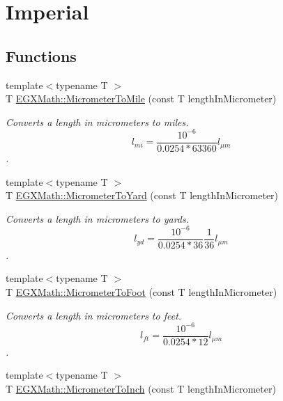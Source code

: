 \hypertarget{group___e_g_x_math-_conversions-_length_conversions-_micrometer-_imperial}{}\section{Imperial}
\label{group___e_g_x_math-_conversions-_length_conversions-_micrometer-_imperial}
\subsection*{Functions}
\begin{DoxyCompactItemize}
\item 
{\footnotesize template$<$typename T $>$ }\\T \mbox{\hyperlink{group___e_g_x_math-_conversions-_length_conversions-_micrometer-_imperial_ga0419c861d5edc78538ff023c12b9b6d9}{E\+G\+X\+Math\+::\+Micrometer\+To\+Mile}} (const T length\+In\+Micrometer)
\begin{DoxyCompactList}\small\item\em Converts a length in micrometers to miles. \[ l_{mi}=\frac{10^{-6}}{0.0254 * 63360} l_{\mu m} \]. \end{DoxyCompactList}\item 
{\footnotesize template$<$typename T $>$ }\\T \mbox{\hyperlink{group___e_g_x_math-_conversions-_length_conversions-_micrometer-_imperial_ga3152a5a36ea33c2ab85fe275569f5ac0}{E\+G\+X\+Math\+::\+Micrometer\+To\+Yard}} (const T length\+In\+Micrometer)
\begin{DoxyCompactList}\small\item\em Converts a length in micrometers to yards. \[ l_{yd}= \frac{10^{-6}}{0.0254 * 36} \frac{1}{36} l_{\mu m} \]. \end{DoxyCompactList}\item 
{\footnotesize template$<$typename T $>$ }\\T \mbox{\hyperlink{group___e_g_x_math-_conversions-_length_conversions-_micrometer-_imperial_gaed71a8fede89b4bc87d3967e4d99c30d}{E\+G\+X\+Math\+::\+Micrometer\+To\+Foot}} (const T length\+In\+Micrometer)
\begin{DoxyCompactList}\small\item\em Converts a length in micrometers to feet. \[ l_{ft}= \frac{10^{-6}}{0.0254 * 12} l_{\mu m} \]. \end{DoxyCompactList}\item 
{\footnotesize template$<$typename T $>$ }\\T \mbox{\hyperlink{group___e_g_x_math-_conversions-_length_conversions-_micrometer-_imperial_gad372acac36a8ca7f56b26858dd01546b}{E\+G\+X\+Math\+::\+Micrometer\+To\+Inch}} (const T length\+In\+Micrometer)

\end{DoxyCompactItemize}
